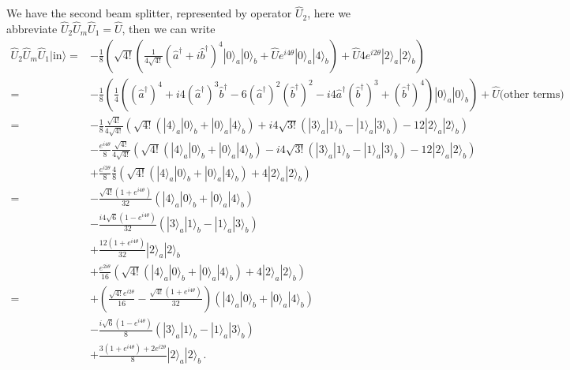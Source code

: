 \documentclass[11pt, oneside]{book}
\theoremstyle{break}
\theoremstyle{break}
\begin{document}
We have the second beam splitter, represented by operator $\hat{U}_2$, here we abbreviate $\hat{U}_2 \hat{U}_m \hat{U}_1 = \hat{U}$, then we can write
\begin{align*}
\hat{U}_2\hat{U}_m \hat{U}_1 |\text{in}\rangle 
=& -\frac{1}{8}\left( 
\sqrt{4!}\left( 
\frac{1}{4\sqrt{4!}}\left( \hat{a}^\dagger + i\hat{b}^\dagger\right)^4 |0\rangle_a|0\rangle_b
+\hat{U}e^{i4\theta}|0\rangle_a |4\rangle_b
\right)
+\hat{U} 4e^{i2\theta}|2\rangle_a|2\rangle_b
\right)\\
=& -\frac{1}{8}\left( 
\frac{1}{4}\left(
(\hat{a}^\dagger)^4 + i4(\hat{a}^\dagger)^3 \hat{b}^\dagger - 6(\hat{a}^\dagger)^2(\hat{b}^\dagger)^2 - i4\hat{a}^\dagger(\hat{b}^\dagger)^3 + (\hat{b}^\dagger)^4
\right) |0\rangle_a|0\rangle_b
\right) + \hat{U}\text{(other terms)}\\
=& -\frac{1}{8}\frac{\sqrt{4!}}{4\sqrt{4!}}\left(\sqrt{4!}\left( |4\rangle_a|0\rangle_b + |0\rangle_a|4\rangle_b\right) + i4\sqrt{3!}\left( |3\rangle_a |1\rangle_b - |1\rangle_a|3\rangle_b\right) - 12|2\rangle_a|2\rangle_b\right)\\
&-\frac{e^{i4\theta}}{8}\frac{\sqrt{4!}}{4\sqrt{4!}}\left(\sqrt{4!}\left( |4\rangle_a|0\rangle_b + |0\rangle_a|4\rangle_b\right) - i4\sqrt{3!}\left( |3\rangle_a |1\rangle_b - |1\rangle_a|3\rangle_b\right) - 12|2\rangle_a|2\rangle_b\right)\\
&+ \frac{e^{i2\theta}}{8}\frac{4}{8}\left( \sqrt{4!}\left( |4\rangle_a | 0\rangle_b +|0\rangle_a | 4\rangle_b\right) +4|2\rangle_a |2\rangle_b\right)\\
=& -\frac{\sqrt{4!}(1+e^{i4\theta})}{32}
(|4\rangle_a | 0\rangle_b + |0\rangle_a |4\rangle_b)\\
&-\frac{i4\sqrt{6}(1 - e^{i4\theta})}{32}(|3\rangle_a |1\rangle_b - |1\rangle_a|3\rangle_b) \\
&+ \frac{12(1+e^{i4\theta})}{32}|2\rangle_a |2\rangle_b\\
& +\frac{e^{2i\theta}}{16}\left( \sqrt{4!}\left( |4\rangle_a | 0\rangle_b +|0\rangle_a | 4\rangle_b\right) +4|2\rangle_a |2\rangle_b\right)\\
=&+\left(\frac{\sqrt{4!}e^{i2\theta}}{16} - \frac{\sqrt{4!}(1+e^{i4\theta})}{32}\right)\left( |4\rangle_a | 0\rangle_b + |0\rangle_a|4\rangle_b\right)\tag{first term}\\
&-\frac{i\sqrt{6}(1-e^{i4\theta})}{8}(|3\rangle_a|1\rangle_b - |1\rangle_a |3\rangle_b) \tag{second term}\\
&+ \frac{3(1+e^{i4\theta})+ 2e^{i2\theta}}{8}|2\rangle_a|2\rangle_b\,.\tag{third term}
\end{align*}
\end{document}
